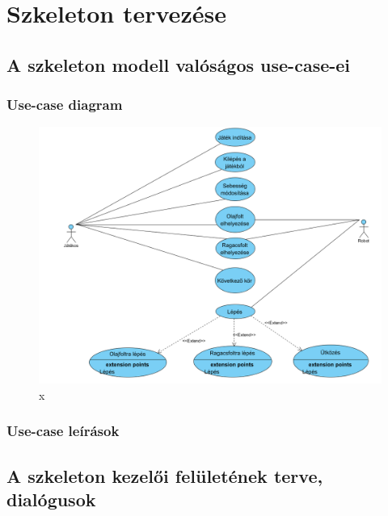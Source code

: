 %
\chapter{Szkeleton tervezése}

\thispagestyle{fancy}

\section{A szkeleton modell valóságos use-case-ei}

\subsection{Use-case diagram}

\begin{figure}[h]
\begin{center}
\includegraphics[width=17cm]{chapters/chapter05/use_case.png}
\caption{x}
\label{fig:SzkeletonUseCase}
\end{center}
\end{figure}

\subsection{Use-case leírások}




\section{A szkeleton kezelői felületének terve, dialógusok}


